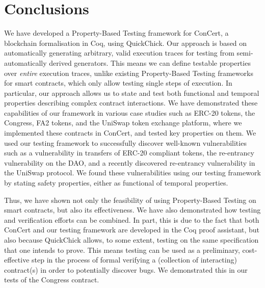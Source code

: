 \documentclass[twoside,11pt,openright]{report}
\newcommand{\pbt}{Property-Based Testing}
\begin{document}
\chapter{Conclusions}
\label{ch:conclusion}
We have developed a \pbt{} framework for ConCert, a blockchain formalisation in Coq, using QuickChick. Our approach is based on automatically generating arbitrary, valid execution traces for testing from semi-automatically derived generators. 
This means we can define testable properties over \textit{entire} execution traces, unlike existing \pbt{} frameworks for smart contracts, which only allow testing single steps of execution. In particular, our approach allows us to state and test both functional and temporal properties describing complex contract interactions. We have demonstrated these capabilities of our framework in various case studies such as ERC-20 tokens, the Congress, FA2 tokens, and the UniSwap token exchange platform, where we implemented these contracts in ConCert, and tested key properties on them. We used our testing framework to successfully discover well-known vulnerabilities such as a vulnerability in transfers of ERC-20 compliant tokens, the re-entrancy vulnerability on the DAO, and a recently discovered re-entrancy vulnerability in the UniSwap protocol. We found these vulnerabilities using our testing framework by stating safety properties, either as functional of temporal properties. 

Thus, we have shown not only the feasibility of using \pbt{} on smart contracts, but also its effectiveness. We have also demonstrated how testing and verification efforts can be combined. In part, this is due to the fact that both ConCert and our testing framework are developed in the Coq proof assistant, but also because QuickChick allows, to some extent, testing on the same specification that one intends to prove. This means testing can be used as a preliminary, cost-effective step in the process of formal verifying a (collection of interacting) contract(s) in order to potentially discover bugs. We demonstrated this in our tests of the Congress contract.
\end{document}
